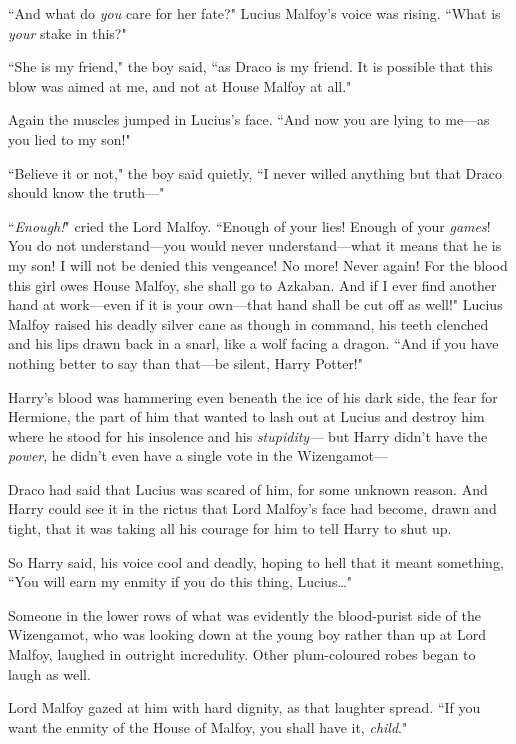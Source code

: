 ``And what do \emph{you} care for her fate?" Lucius Malfoy's voice was rising. ``What is \emph{your} stake in this?"

``She is my friend," the boy said, ``as Draco is my friend. It is possible that this blow was aimed at me, and not at House Malfoy at all."

Again the muscles jumped in Lucius's face. ``And now you are lying to me—as you lied to my son!"

``Believe it or not," the boy said quietly, ``I never willed anything but that Draco should know the truth—"

``\emph{Enough!}" cried the Lord Malfoy. ``Enough of your lies! Enough of your \emph{games}! You do not understand—you would never understand—what it means that he is my son! I will not be denied this vengeance! No more! Never again! For the blood this girl owes House Malfoy, she shall go to Azkaban. And if I ever find another hand at work—even if it is your own—that hand shall be cut off as well!" Lucius Malfoy raised his deadly silver cane as though in command, his teeth clenched and his lips drawn back in a snarl, like a wolf facing a dragon. ``And if you have nothing better to say than that—be silent, Harry Potter!"

\later

Harry's blood was hammering even beneath the ice of his dark side, the fear for Hermione, the part of him that wanted to lash out at Lucius and destroy him where he stood for his insolence and his \emph{stupidity—} but Harry didn't have the \emph{power}, he didn't even have a single vote in the Wizengamot—

Draco had said that Lucius was scared of him, for some unknown reason. And Harry could see it in the rictus that Lord Malfoy's face had become, drawn and tight, that it was taking all his courage for him to tell Harry to shut up.

So Harry said, his voice cool and deadly, hoping to hell that it meant something, ``You will earn my enmity if you do this thing, Lucius{\ldots}"

Someone in the lower rows of what was evidently the blood-purist side of the Wizengamot, who was looking down at the young boy rather than up at Lord Malfoy, laughed in outright incredulity. Other plum-coloured robes began to laugh as well.

Lord Malfoy gazed at him with hard dignity, as that laughter spread. ``If you want the enmity of the House of Malfoy, you shall have it, \emph{child}."

